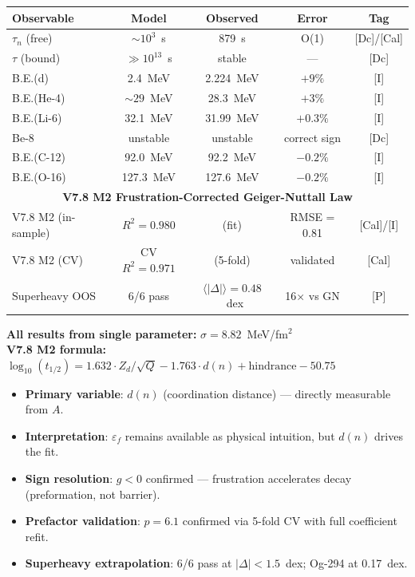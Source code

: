 \begin{tcolorbox}[colback=blue!5!white, colframe=blue!75!black, breakable, title=Results Snapshot --- V7.8 M2 Model]
\begin{center}
\begin{tabular}{lcccc}
\hline
\textbf{Observable} & \textbf{Model} & \textbf{Observed} & \textbf{Error} & \textbf{Tag} \\
\hline
$\tau_n$ (free) & $\sim 10^3$~s & 879~s & O(1) & [Dc]/[Cal] \\
$\tau$ (bound) & $\gg 10^{13}$~s & stable & --- & [Dc] \\
B.E.(d) & 2.4~MeV & 2.224~MeV & $+9\%$ & [I] \\
B.E.(He-4) & $\sim 29$~MeV & 28.3~MeV & $+3\%$ & [I] \\
B.E.(Li-6) & 32.1~MeV & 31.99~MeV & $+0.3\%$ & [I] \\
Be-8 & unstable & unstable & correct sign & [Dc] \\
B.E.(C-12) & 92.0~MeV & 92.2~MeV & $-0.2\%$ & [I] \\
B.E.(O-16) & 127.3~MeV & 127.6~MeV & $-0.2\%$ & [I] \\
\hline
\multicolumn{5}{c}{\textbf{V7.8 M2 Frustration-Corrected Geiger-Nuttall Law}} \\
\hline
V7.8 M2 (in-sample) & $R^2 = 0.980$ & (fit) & RMSE = 0.81 & [Cal]/[I] \\
V7.8 M2 (CV) & CV $R^2 = 0.971$ & (5-fold) & validated & [Cal] \\
Superheavy OOS & 6/6 pass & $\langle|\Delta|\rangle = 0.48$~dex & 16$\times$ vs GN & [P] \\
\hline
\end{tabular}
\end{center}
\vspace{0.3cm}
\textbf{All results from single parameter:} $\sigma = 8.82$~MeV/fm$^2$ \\
\textbf{V7.8 M2 formula:} $\log_{10}(t_{1/2}) = 1.632 \cdot Z_d/\sqrt{Q} - 1.763 \cdot d(n) + \text{hindrance} - 50.75$
\end{tcolorbox}

\begin{tcolorbox}[colback=green!5!white, colframe=green!75!black, title=What V7.8 M2 Adds Over Earlier Versions]
\begin{itemize}
    \item \textbf{Primary variable}: $d(n)$ (coordination distance) --- directly measurable from $A$.
    \item \textbf{Interpretation}: $\varepsilon_f$ remains available as physical intuition, but $d(n)$ drives the fit.
    \item \textbf{Sign resolution}: $g < 0$ confirmed --- frustration accelerates decay (preformation, not barrier).
    \item \textbf{Prefactor validation}: $p = 6.1$ confirmed via 5-fold CV with full coefficient refit.
    \item \textbf{Superheavy extrapolation}: 6/6 pass at $|\Delta| < 1.5$~dex; Og-294 at 0.17~dex.
\end{itemize}
\end{tcolorbox}

